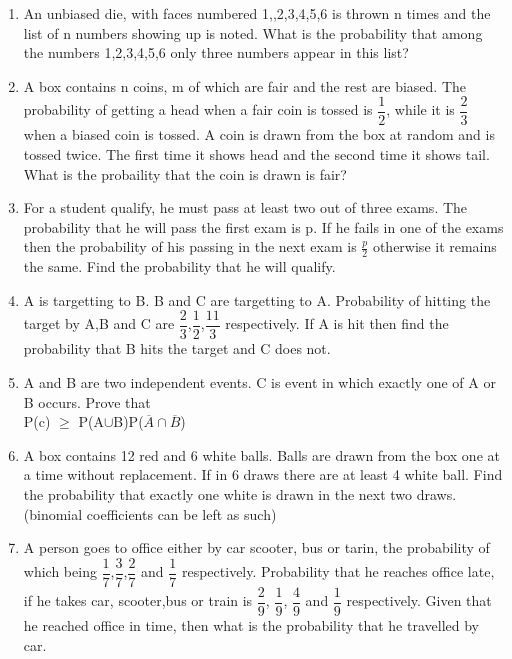 \documentclass[journal,12pt,twocolumn]{IEEEtran}
\begin{document}
\begin{enumerate}[label=\arabic*]
	\item An unbiased die, with faces numbered 1,,2,3,4,5,6 is thrown n times and the list of n numbers showing up is noted. What is the probability that among the numbers 1,2,3,4,5,6 only three numbers appear in this list?\\
	\item A box contains n coins, m of which are fair and the rest are biased. The probability of getting a head when a fair coin is tossed is $\dfrac{1}{2}$, while it is $\dfrac{2}{3}$ when a biased coin is tossed. A coin is drawn from the box at random and is tossed twice. The first time it shows head and the second time it shows tail. What is the probaility that the coin is drawn is fair?\\
	\item For a student qualify, he must pass at least two out of three exams. The probability that he will pass the first exam is p. If he fails in one of the exams then the probability of his passing in the next exam is $\frac{p}{2}$ otherwise it remains the same. Find the probability that he will qualify.\\
	\item A is targetting to B. B and C are targetting to A. Probability of hitting the target by A,B and C are $\dfrac{2}{3}$,$\dfrac{1}{2}$,$\dfrac{11}{3}$ respectively. If A is hit then find the probability that B hits the target and C does not.\\
	\item A and B are two independent events. C is event in which exactly one of A or B occurs. Prove that\\
	P(c) $\geq$ P(A$\cup$B)P($\overline{A} \cap \overline{B}$)\\
	\item A box contains 12 red and 6 white balls. Balls are drawn from the box one at a time without replacement. If in 6 draws there are at least 4 white ball. Find the probability that exactly one white is drawn in the next two draws.(binomial coefficients can be left as such)\\
	\item A person goes to office either by car scooter, bus or tarin, the probability of which being $\dfrac{1}{7}$,$\dfrac{3}{7}$,$\dfrac{2}{7}$ and $\dfrac{1}{7}$ respectively. Probability that he reaches office late, if he takes car, scooter,bus or train is $\dfrac{2}{9}$, $\dfrac{1}{9}$, $\dfrac{4}{9}$ and $\dfrac{1}{9}$ respectively. Given that he reached office in time, then what is the probability that he travelled by car.\\

\end{enumerate}
\end{document}
